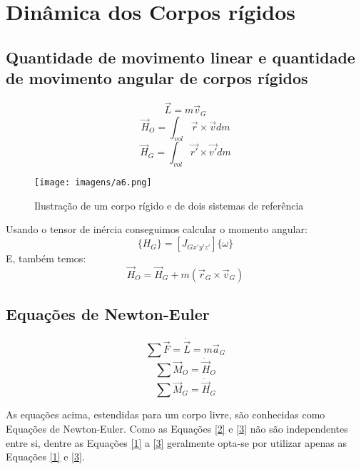 \documentclass[a4paper, 12pt]{article}
\begin{document}
\newpage
\section{Dinâmica dos Corpos rígidos}
	\subsection{Quantidade de movimento linear e quantidade de movimento angular de corpos rígidos}
	 	\begin{equation}
	 		\vec{L} = m\vec{v}_G
	 	\end{equation}
	 	\begin{equation}
	 		\vec{H}_O = \int_{vol} \vec{r} \times \vec{v}dm
	 	\end{equation}
	 	\begin{equation}
	 		\vec{H}_G = \int_{vol} \vec{r'} \times \vec{v'}dm
	 	\end{equation}
		\begin{figure}[h]
			\center
			\texttt{[image: imagens/a6.png]} 
			\caption{Ilustração de um corpo rígido e de dois sistemas de referência}
		\end{figure}	

		Usando o tensor de inércia conseguimos calcular o momento angular:
		\begin{equation}
			\{H_G\} = [J_{Gx'y'z'}]\{\omega \}
		\end{equation}
		E, também temos:
		\begin{equation}
			\vec{H}_O = \vec{H}_G + m (\vec{r}_G \times \vec{v}_G)
		\end{equation}
	
	\subsection{Equações de Newton-Euler}
		\begin{equation}
			\sum \vec{F} = \dot{\vec{L}} = m\vec{a}_G
			\label{1}
		\end{equation}
		\begin{equation}
			\sum \vec{M}_O = \dot{\vec{H}}_O
			\label{2}
		\end{equation}
		\begin{equation}
			\sum \vec{M}_G = \dot{\vec{H}}_G
			\label{3}
		\end{equation}
		
		As equações acima, estendidas para um corpo livre, são conhecidas como Equações de Newton-Euler.
		Como as Equações \ref{2} e \ref{3} não são independentes entre si, dentre as Equações \ref{1} a \ref{3} geralmente opta-se por utilizar apenas as Equações \ref{1} e \ref{3}.
	
\end{document}
